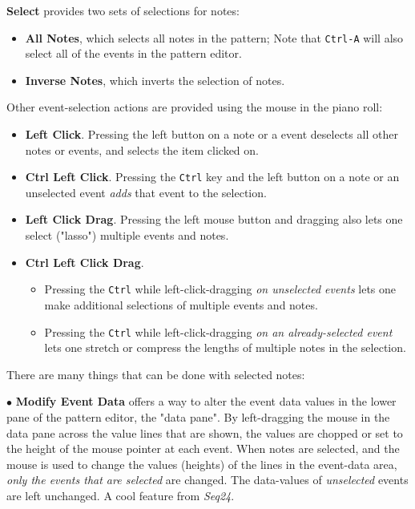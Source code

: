    \textbf{Select} provides two sets of selections for notes:
   \begin{itemize}
      \item \textbf{All Notes}, which selects all notes in the pattern;
         Note that  \texttt{Ctrl-A} will also select
         all of the events in the pattern editor.
      \item \textbf{Inverse Notes}, which inverts the selection of notes.
   \end{itemize}

   Other event-selection actions are provided using the mouse in the piano roll:

   \begin{itemize}
      \item {}
         \textbf{Left Click}.
         Pressing the left button on a note or a event deselects all other
         notes or events, and selects the item clicked on.
      \item {}
         \textbf{Ctrl Left Click}.
         Pressing the \texttt{Ctrl} key and the left button on a note or an
         unselected event \textsl{adds} that event to the selection.
      \item {}
         \textbf{Left Click Drag}.
         Pressing the left mouse button and dragging also lets one
         select ("lasso") multiple events and notes.
      \item {}
         \textbf{Ctrl Left Click Drag}.
         \begin{itemize}
            \item Pressing the \texttt{Ctrl} while left-click-dragging
               \textsl{on unselected events} lets one make additional
               selections of multiple events and notes.
            \item Pressing the \texttt{Ctrl} while left-click-dragging
               \textsl{on an already-selected event} lets one stretch or
               compress the lengths of multiple notes in the selection.
         \end{itemize}
   \end{itemize}

   There are many things that can be done with selected notes:

   $\bullet$ \textbf{Modify Event Data} offers a way to
   alter the event data values in 
   the lower pane of the pattern editor, the "data pane".
   By left-dragging the mouse in the data pane across the value lines that are
   shown, the values are chopped or set to the height of the mouse pointer at
   each event.
   When notes are selected, and the
   mouse is used to change the values (heights) of the lines in the event-data
   area,
   \textsl{only the events that are selected} are changed.  The data-values of
   \textsl{unselected} events are left unchanged.
   A cool feature from \textsl{Seq24}.

